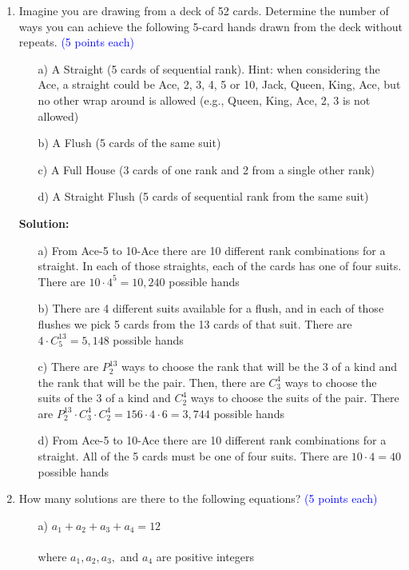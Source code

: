 \documentclass{article}
\newcommand{\pte}[1]{\textcolor{blue}{(#1 points each)}}
\newenvironment{solution}
{
\par
\color{blue}
\textbf{Solution:}
}
{
\par
}
\begin{document}
\begin{enumerate}
\item Imagine you are drawing from a deck of 52 cards. Determine the number of ways you can achieve the following 5-card hands drawn from the deck without repeats. \pte{5}
\begin{enumerate}
    \item[a)] A Straight (5 cards of sequential rank). Hint: when considering the Ace, a straight could be Ace, 2, 3, 4, 5 or 10, Jack, Queen, King, Ace, but no other wrap around is allowed (e.g., Queen, King, Ace, 2, 3 is not allowed)
    \item[b)] A Flush (5 cards of the same suit)
    \item[c)] A Full House (3 cards of one rank and 2 from a single other rank)
    \item[d)] A Straight Flush (5 cards of sequential rank from the same suit)
\end{enumerate}
\begin{solution}
\begin{enumerate}
    \item[a)] From Ace-5 to 10-Ace there are 10 different rank combinations for a straight. In each of those straights, each of the cards has one of four suits. There are $10 \cdot 4^5 = 10,240$ possible hands
    \item[b)] There are 4 different suits available for a flush, and in each of those flushes we pick 5 cards from the 13 cards of that suit. There are $4 \cdot C^{13}_5 = 5,148$ possible hands
    \item[c)] There are $P^{13}_2$ ways to choose the rank that will be the 3 of a kind and the rank that will be the pair. Then, there are $C^4_3$ ways to choose the suits of the 3 of a kind and $C^4_2$ ways to choose the suits of the pair. There are $P^{13}_2 \cdot C^4_3 \cdot C^4_2 = 156 \cdot 4 \cdot 6 = 3,744$ possible hands
    \item[d)] From Ace-5 to 10-Ace there are 10 different rank combinations for a straight. All of the 5 cards must be one of four suits. There are $10 \cdot 4 = 40$ possible hands
\end{enumerate}
\end{solution}

\item How many solutions are there to the following equations? \pte{5}
\begin{enumerate}
    \item[a)] $a_1 + a_2 + a_3 + a_4 = 12$\\\\
where $a_1, a_2, a_3,$ and $a_4$ are positive integers\\


\end{enumerate}
\end{enumerate}
\end{document}

